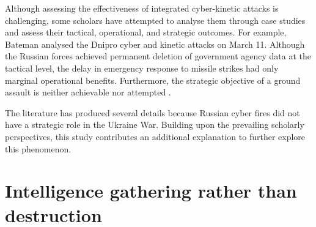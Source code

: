 Although assessing the effectiveness of integrated cyber-kinetic attacks is challenging, some scholars have attempted to analyse them through case studies and assess their tactical, operational, and strategic outcomes. For example, Bateman analysed the Dnipro cyber and kinetic attacks on March 11. Although the Russian forces achieved permanent deletion of government agency data at the tactical level, the delay in emergency response to missile strikes had only marginal operational benefits. Furthermore, the strategic objective of a ground assault is neither achievable nor attempted \autocite[11]{baetman_2022_russias}.



The literature has produced several details because Russian cyber fires did not have a strategic role in the Ukraine War. Building upon the prevailing scholarly perspectives, this study contributes an additional explanation to further explore this phenomenon.

\section{Intelligence gathering rather than destruction}

